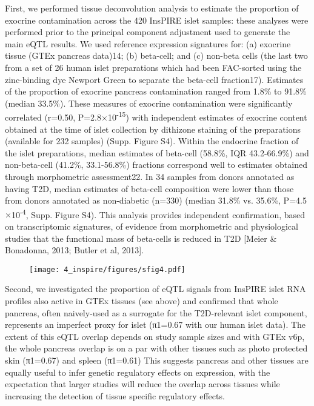 First, we performed tissue deconvolution analysis to estimate the proportion of exocrine contamination across the 420 InsPIRE islet samples: these analyses were performed prior to the principal component adjustment used to generate the main eQTL results. We used reference expression signatures for: (a) exocrine tissue (GTEx pancreas data)14; (b) beta-cell; and (c) non-beta cells (the last two from a set of 26 human islet preparations which had been FAC-sorted using the zinc-binding dye Newport Green to separate the beta-cell fraction17). Estimates of the proportion of exocrine pancreas contamination ranged from 1.8\% to 91.8\% (median 33.5\%). These measures of exocrine contamination were significantly correlated (r=0.50, P=2.8$\times$10\textsuperscript{-15}) with independent estimates of exocrine content obtained at the time of islet collection by dithizone staining of the preparations (available for 232 samples) (Supp. Figure S4). Within the endocrine fraction of the islet preparations, median estimates of beta-cell (58.8\%, IQR 43.2-66.9\%) and non-beta-cell (41.2\%, 33.1-56.8\%) fractions correspond well to estimates obtained through morphometric assessment22. In 34 samples from donors annotated as having T2D, median estimates of beta-cell composition were lower than those from donors annotated as non-diabetic (n=330) (median 31.8\% vs. 35.6\%, P=4.5$\times$10\textsuperscript{-4}, Supp. Figure S4). This analysis provides independent confirmation, based on transcriptomic signatures, of evidence from morphometric and physiological studies that the functional mass of beta-cells is reduced in T2D [Meier \& Bonadonna, 2013; Butler et al, 2013]. \\

\begin{figure}
    \centering
    \texttt{[image: 4\_inspire/figures/sfig4.pdf]}
    \caption{}
    \label{fig:c4_sf4}
\end{figure}

    
Second, we investigated the proportion of eQTL signals from InsPIRE islet RNA profiles also active in GTEx tissues (see above) and confirmed that whole pancreas, often naively-used as a surrogate for the T2D-relevant islet component, represents an imperfect proxy for islet (π1=0.67 with our human islet data). The extent of this eQTL overlap depends on study sample sizes and with GTEx v6p, the whole pancreas overlap is on a par with other tissues such as photo protected skin (π1=0.67) and spleen (π1=0.61) This suggests pancreas and other tissues are equally useful to infer genetic regulatory effects on expression, with the expectation that larger studies will reduce the overlap across tissues while increasing the detection of tissue specific regulatory effects. \\
      
